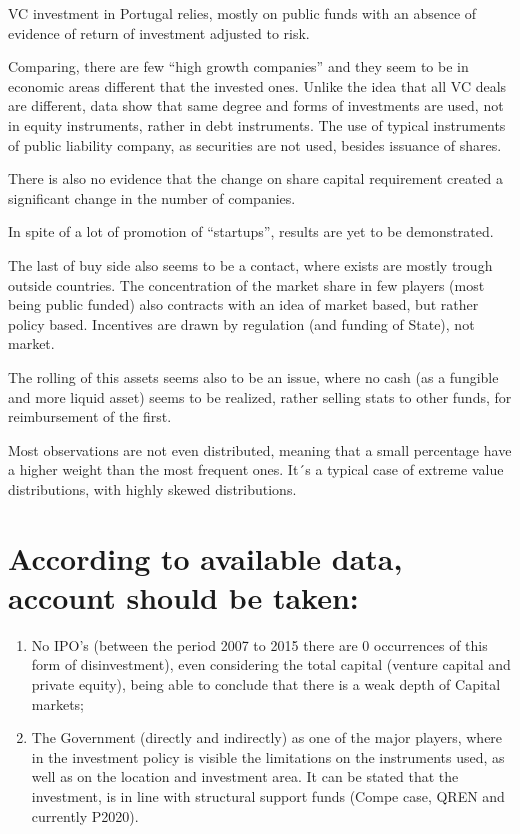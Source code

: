 \documentclass[]{book}
\theoremstyle{definition}
\theoremstyle{definition}
\theoremstyle{definition}
\theoremstyle{remark}
\begin{document}
VC investment in Portugal relies, mostly on public funds with an absence
of evidence of return of investment adjusted to risk.

Comparing, there are few ``high growth companies'' and they seem to be
in economic areas different that the invested ones. Unlike the idea that
all VC deals are different, data show that same degree and forms of
investments are used, not in equity instruments, rather in debt
instruments. The use of typical instruments of public liability company,
as securities are not used, besides issuance of shares.

There is also no evidence that the change on share capital requirement
created a significant change in the number of companies.

In spite of a lot of promotion of ``startups'', results are yet to be
demonstrated.

The last of buy side also seems to be a contact, where exists are mostly
trough outside countries. The concentration of the market share in few
players (most being public funded) also contracts with an idea of market
based, but rather policy based. Incentives are drawn by regulation (and
funding of State), not market.

The rolling of this assets seems also to be an issue, where no cash (as
a fungible and more liquid asset) seems to be realized, rather selling
stats to other funds, for reimbursement of the first.

Most observations are not even distributed, meaning that a small
percentage have a higher weight than the most frequent ones. It´s a
typical case of extreme value distributions, with highly skewed
distributions.

\section{According to available data, account should be
taken:}\label{according-to-available-data-account-should-be-taken}

\begin{enumerate}
\def\labelenumi{\alph{enumi})}
\item
  No IPO's (between the period 2007 to 2015 there are 0 occurrences of
  this form of disinvestment), even considering the total capital
  (venture capital and private equity), being able to conclude that
  there is a weak depth of Capital markets;
\item
  The Government (directly and indirectly) as one of the major players,
  where in the investment policy is visible the limitations on the
  instruments used, as well as on the location and investment area. It
  can be stated that the investment, is in line with structural support
  funds (Compe case, QREN and currently P2020).
\end{enumerate}
\end{document}
